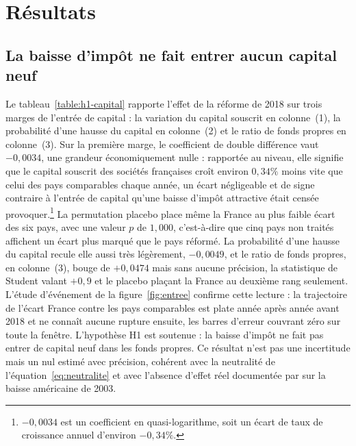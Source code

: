 \section{Résultats}\label{sec:resultats}

\subsection{La baisse d'impôt ne fait entrer aucun capital neuf}

Le tableau~\ref{table:h1-capital} rapporte l'effet de la réforme de 2018 sur trois marges de
l'entrée de capital : la variation du capital souscrit en colonne~(1), la probabilité d'une hausse
du capital en colonne~(2) et le ratio de fonds propres en colonne~(3). Sur la première marge, le
coefficient de double différence vaut $-0{,}0034$, une grandeur économiquement nulle : rapportée au
niveau, elle signifie que le capital souscrit des sociétés françaises croît environ $0{,}34\%$ moins
vite que celui des pays comparables chaque année, un écart négligeable et de signe contraire à l'entrée de
capital qu'une baisse d'impôt attractive était censée provoquer.\footnote{$-0{,}0034$ est un
coefficient en quasi-logarithme, soit un écart de taux de croissance annuel d'environ
$-0{,}34\%$.} La permutation placebo place même la France au plus faible écart des six pays, avec
une valeur $p$ de $1{,}000$, c'est-à-dire que cinq pays non traités affichent un écart plus marqué
que le pays réformé. La probabilité d'une hausse du capital recule elle aussi très légèrement,
$-0{,}0049$, et le ratio de fonds propres, en colonne~(3), bouge de $+0{,}0474$ mais sans aucune
précision, la statistique de Student valant $+0{,}9$ et le placebo plaçant la France au deuxième rang
seulement. L'étude d'événement de la figure~\ref{fig:entree} confirme cette lecture : la trajectoire
de l'écart France contre les pays comparables est plate année après année avant 2018 et ne connaît aucune rupture
ensuite, les barres d'erreur couvrant zéro sur toute la fenêtre. L'hypothèse H1 est soutenue : la
baisse d'impôt ne fait pas entrer de capital neuf dans les fonds propres. Ce résultat n'est pas une
incertitude mais un nul estimé avec précision, cohérent avec la neutralité de
l'équation~\eqref{eq:neutralite} et avec l'absence d'effet réel documentée par \citet{yagan2015}
sur la baisse américaine de 2003.



